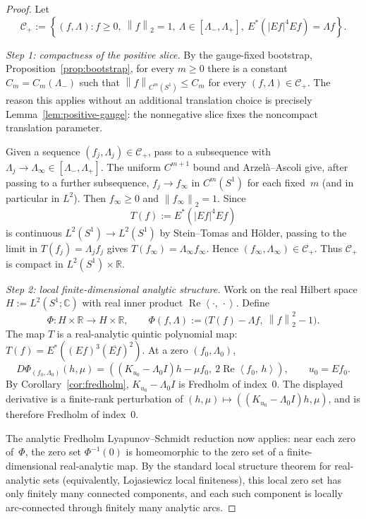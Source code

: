 \documentclass[12pt]{article}
\theoremstyle{definition}
\theoremstyle{remark}
\newcommand{\R}{\mathbb{R}}
\newcommand{\C}{\mathbb{C}}
\newcommand{\norm}[1]{\left\|#1\right\|}
\newcommand{\ip}[2]{\left\langle #1,\, #2\right\rangle}
\newcommand{\re}{\operatorname{Re}}
\begin{document}
\begin{proof}
  Let
  \[
    \mathcal C_+
    :=
    \left\{
      (f,\Lambda):
      f\geq0,\ \norm{f}_2=1,\ \Lambda\in[\Lambda_-,\Lambda_+],\
      E^*(|Ef|^4Ef)=\Lambda f
    \right\}.
  \]

  \emph{Step 1: compactness of the positive slice.}
  By the gauge-fixed bootstrap, Proposition~\ref{prop:bootstrap}, for
  every $m\geq0$ there is a constant $C_m=C_m(\Lambda_-)$ such that
  $\norm{f}_{C^m(S^1)}\leq C_m$ for every $(f,\Lambda)\in\mathcal C_+$.
  The reason this applies without an additional translation choice is
  precisely Lemma~\ref{lem:positive-gauge}: the nonnegative slice fixes
  the noncompact translation parameter.

  Given a sequence $(f_j,\Lambda_j)\in\mathcal C_+$, pass to a subsequence
  with $\Lambda_j\to\Lambda_\infty\in[\Lambda_-,\Lambda_+]$.  The uniform
  $C^{m+1}$ bound and Arzel\`a--Ascoli give, after passing to a further
  subsequence, $f_j\to f_\infty$ in $C^m(S^1)$ for each fixed~$m$ (and in
  particular in $L^2$).  Then $f_\infty\geq0$ and
  $\norm{f_\infty}_2=1$.  Since
  \[
    T(f):=E^*(|Ef|^4Ef)
  \]
  is continuous $L^2(S^1)\to L^2(S^1)$ by Stein--Tomas and H\"older,
  passing to the limit in $T(f_j)=\Lambda_j f_j$ gives
  $T(f_\infty)=\Lambda_\infty f_\infty$.  Hence
  $(f_\infty,\Lambda_\infty)\in\mathcal C_+$.  Thus $\mathcal C_+$ is
  compact in $L^2(S^1)\times\R$.

  \emph{Step 2: local finite-dimensional analytic structure.}
  Work on the real Hilbert space $H:=L^2(S^1;\C)$ with real inner product
  $\re\ip{\cdot}{\cdot}$.  Define
  \[
    \Phi:H\times\R\to H\times\R,\qquad
    \Phi(f,\Lambda):=\bigl(T(f)-\Lambda f,\ \norm{f}_2^2-1\bigr).
  \]
  The map $T$ is a real-analytic quintic polynomial map:
  $T(f)=E^*((Ef)^3(\overline{Ef})^2)$.  At a zero $(f_0,\Lambda_0)$,
  \[
    D\Phi_{(f_0,\Lambda_0)}(h,\mu)
    =
    \left(
      (K_{u_0}-\Lambda_0 I)h-\mu f_0,\
      2\re\ip{f_0}{h}
    \right),
    \qquad u_0=Ef_0.
  \]
  By Corollary~\ref{cor:fredholm}, $K_{u_0}-\Lambda_0 I$ is Fredholm of
  index~$0$.  The displayed derivative is a finite-rank perturbation of
  $(h,\mu)\mapsto((K_{u_0}-\Lambda_0 I)h,\mu)$, and is therefore Fredholm
  of index~$0$.

  The analytic Fredholm Lyapunov--Schmidt reduction now applies: near
  each zero of~$\Phi$, the zero set $\Phi^{-1}(0)$ is homeomorphic to the
  zero set of a finite-dimensional real-analytic map.  By the standard
  local structure theorem for real-analytic sets (equivalently,
  Lojasiewicz local finiteness), this local zero set has only finitely
  many connected components, and each such component is locally
  arc-connected through finitely many analytic arcs.


\end{proof}
\end{document}
